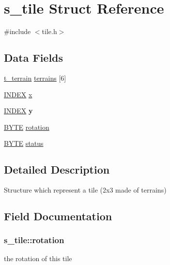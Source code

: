 \hypertarget{structs__tile}{}\section{s\+\_\+tile Struct Reference}
\label{structs__tile}


{\ttfamily \#include $<$tile.\+h$>$}

\subsection*{Data Fields}
\begin{DoxyCompactItemize}
\item 
\hyperlink{structs__terrain}{t\+\_\+terrain} \hyperlink{structs__tile_a31ded1ea12a7b15ca42dcc9a5f41eb6b}{terrains} \mbox{[}6\mbox{]}
\item 
\hyperlink{honshu_8h_ac6885dbfb371c33e523c7fb046118b36}{I\+N\+D\+EX} \hyperlink{structs__tile_aa515ee382fc80e5ae75c855d86e0ec3c}{x}
\item 
\hyperlink{honshu_8h_ac6885dbfb371c33e523c7fb046118b36}{I\+N\+D\+EX} {\bfseries y}\hypertarget{structs__tile_ad4e02582f035d71c89bfe4b4e3f56bc3}{}\label{structs__tile_ad4e02582f035d71c89bfe4b4e3f56bc3}

\item 
\hyperlink{array_8h_aec93e83855ac17c3c25c55c37ca186dd}{B\+Y\+TE} \hyperlink{structs__tile_ac3e1f8161ab8afe179a7518c4cb5e5ea}{rotation}
\item 
\hyperlink{array_8h_aec93e83855ac17c3c25c55c37ca186dd}{B\+Y\+TE} \hyperlink{structs__tile_affc8310793704fcefa825095bfdc1f7f}{status}
\end{DoxyCompactItemize}


\subsection{Detailed Description}
Structure which represent a tile (2x3 made of terrains) 

\subsection{Field Documentation}
\subsubsection[{\texorpdfstring{rotation}{rotation}}]{ s\+\_\+tile\+::rotation}\hypertarget{structs__tile_ac3e1f8161ab8afe179a7518c4cb5e5ea}{}\label{structs__tile_ac3e1f8161ab8afe179a7518c4cb5e5ea}
the rotation of this tile 
